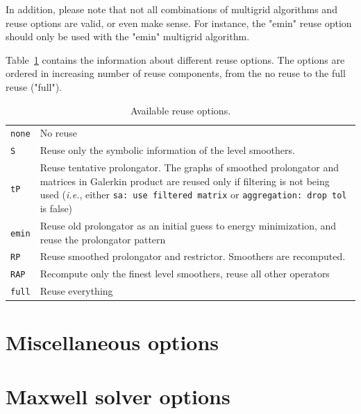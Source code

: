 In addition, please note that not all combinations of multigrid algorithms and
reuse options are valid, or even make sense. For instance, the "emin" reuse
option should only be used with the "emin" multigrid algorithm.

Table~\ref{t:reuse_types} contains the information about different reuse
options. The options are ordered in increasing number of reuse components, from
the no reuse to the full reuse ("full").

\begin{table}[H]
  \begin{center}
    \begin{tabular}{p{3.0cm} p{12cm}}
      \toprule
      \verb!none!   & No reuse \\
      \verb!S!      & Reuse only the symbolic information of the level smoothers. \\
      \verb!tP!     & Reuse tentative prolongator. The graphs of smoothed
                      prolongator and matrices in Galerkin product are reused
                      only if filtering is not being used ({\it i.e.}, either
                      \verb!sa: use filtered matrix! or \verb!aggregation: drop tol! is false) \\
      \verb!emin!   & Reuse old prolongator as an initial guess to energy
                      minimization, and reuse the prolongator pattern \\
      \verb!RP!     & Reuse smoothed prolongator and restrictor. Smoothers are
                      recomputed. \\
      \verb!RAP!    & Recompute only the finest level smoothers, reuse all other operators \\
      \verb!full!   & Reuse everything \\
      \bottomrule
    \end{tabular}
    \caption{Available reuse options.}
\label{t:reuse_types}
  \end{center}
\end{table}



\section{Miscellaneous options}




\section{Maxwell solver options}



